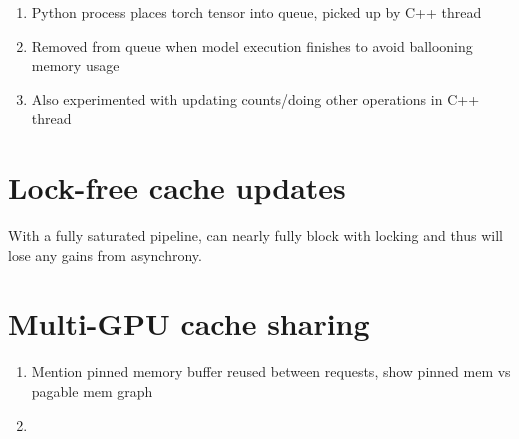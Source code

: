 \begin{enumerate}
    \item Python process places torch tensor into queue, picked up by C++ thread
    \item Removed from queue when model execution finishes to avoid ballooning memory usage
    \item Also experimented with updating counts/doing other operations in C++ thread
\end{enumerate}

\section{Lock-free cache updates}
With a fully saturated pipeline, can nearly fully block with locking and thus will lose any gains from asynchrony.


\section{Multi-GPU cache sharing}

\begin{enumerate}
    \item Mention pinned memory buffer reused between requests, show pinned mem vs pagable mem graph
    \item 
\end{enumerate}
